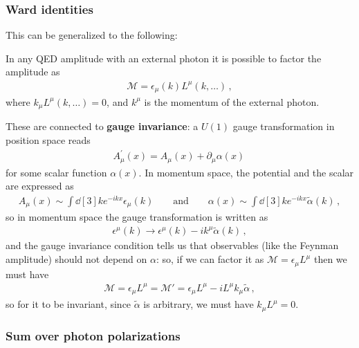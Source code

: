 \documentclass[main.tex]{subfiles}
\begin{document}
\subsubsection{Ward identities}

This can be generalized to the following: 
\begin{claim}
In any QED amplitude with an external photon it is possible to factor the amplitude as 
%
\begin{align} \label{eq:ward-identities}
\mathcal{M} = \epsilon_{\mu } (k) L^{\mu } (k, \dots)
\,,
\end{align}
%
where \(k_\mu L^{\mu } (k, \dots) = 0\), and \(k^{\mu }\) is the momentum of the external photon.
\end{claim}

These are connected to \textbf{gauge invariance}: a \(U(1)\) gauge transformation in position space reads 
%
\begin{align}
A^{\prime }_{\mu } (x) = A_{\mu } (x) + \partial_{\mu} \alpha (x)
\,
\end{align}
%
for some scalar function \(\alpha (x)\). In momentum space, the potential and the scalar are expressed as 
%
\begin{align}
A_{\mu } (x) \sim \int \dd[3]{k} e^{-ikx} \epsilon_{\mu } (k) 
\qquad \text{and} \qquad
\alpha (x) \sim \int \dd[3]{k} e^{-ikx} \widetilde{\alpha}(k)
\,,
\end{align}
%
so in momentum space the gauge transformation is written as 
%
\begin{align}
\epsilon^{\mu }(k) \to \epsilon^{\mu }(k) - i k^{\mu } \widetilde{\alpha} (k)
\,,
\end{align}
%
and the gauge invariance condition tells us that observables (like the Feynman amplitude) should not depend on \(\alpha\): so, if we can factor it as \(\mathcal{M} = \epsilon_{\mu } L^{\mu }\) then we must have 
%
\begin{align}
\mathcal{M} = \epsilon_{\mu } L^{\mu }
= \mathcal{M}' = \epsilon_{\mu } L^{\mu } - i L^{\mu } k_{\mu } \widetilde{\alpha}
\,,
\end{align}
%
so for it to be invariant, since \(\widetilde{\alpha} \) is arbitrary, we must have \(k_{\mu } L^{\mu } = 0\).


\subsubsection{Sum over photon polarizations}
\end{document}
